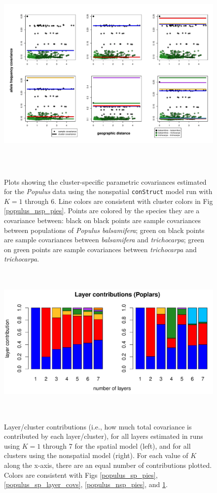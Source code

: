 \documentclass[10pt,letterpaper]{article}
\newcommand{\tri}{\textit{trichocarpa}}
\newcommand{\bals}{\textit{balsamifera}}
\begin{document}
\begin{figure}
	\centering
		{\includegraphics[width=6in,height=4in]{figs/populus/populus_nsp_layer_covs.pdf}}
	\caption{
	Plots showing the cluster-specific parametric covariances 
	estimated for the \textit{Populus} data using 
	the nonspatial \texttt{conStruct} model run with $K=1$ through 6.
	Line colors are consistent with cluster colors in Fig \ref{populus_nsp_pies}.
	Points are colored by the species they are a covariance between:
	black on black points are sample covariances between populations of \textit{Populus balsamifera};
	green on black points are sample covariances between \bals{} and \tri{};
	green on green points are sample covariances between \tri{} and \tri{}.
    }\label{populus_nsp_layer_covs}
\end{figure}

\begin{figure}
	\centering
		{\includegraphics[width=6in,height=3in]{figs/populus/populus_laycon_barplots.pdf}}
	\caption{
	Layer/cluster contributions (i.e., how much total covariance is contributed by each layer/cluster), 
	for all layers estimated in runs using $K = 1$ through 7 
	for the spatial model (left), 
	and for all clusters using the nonspatial model (right).
	For each value of $K$ along the x-axis, there are an equal number of contributions plotted.
	Colors are consistent with Figs \ref{populus_sp_pies}, \ref{populus_sp_layer_covs}, \ref{populus_nsp_pies}, and \ref{populus_nsp_layer_covs}.
    }\label{populus_laycon}
\end{figure}
\end{document}
